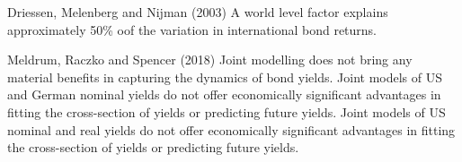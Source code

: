 Driessen, Melenberg and Nijman (2003)
A world level factor explains approximately 50\% oof the variation in international bond returns.


Meldrum, Raczko and Spencer (2018)
Joint modelling does not bring any material benefits in capturing the dynamics of bond yields.
Joint models of US and German nominal yields do not offer economically significant advantages in fitting the cross-section of yields or predicting future yields. 
Joint models of US nominal and real yields do not offer economically significant advantages in fitting the cross-section of yields or predicting future yields.





